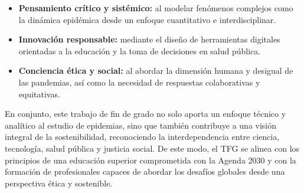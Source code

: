 \begin{itemize}
    \item \textbf{Pensamiento crítico y sistémico:} al modelar fenómenos complejos como la dinámica epidémica desde un enfoque cuantitativo e interdisciplinar.
    \item \textbf{Innovación responsable:} mediante el diseño de herramientas digitales orientadas a la educación y la toma de decisiones en salud pública.
    \item \textbf{Conciencia ética y social:} al abordar la dimensión humana y desigual de las pandemias, así como la necesidad de respuestas colaborativas y equitativas.
\end{itemize}

En conjunto, este trabajo de fin de grado no solo aporta un enfoque técnico y analítico al estudio de epidemias, sino que también contribuye a una visión integral de la sostenibilidad, reconociendo la interdependencia entre ciencia, tecnología, salud pública y justicia social.
De este modo, el TFG se alinea con los principios de una educación superior comprometida con la Agenda 2030 y con la formación de profesionales capaces de abordar los desafíos globales desde una perspectiva ética y sostenible.


